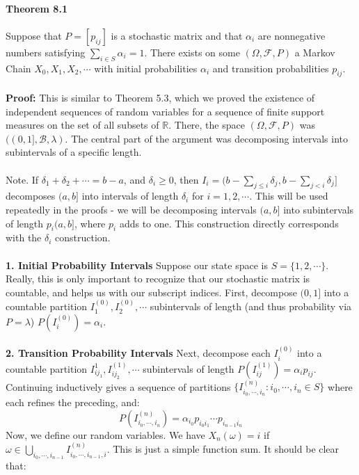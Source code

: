 \documentclass[12pt,a4paper]{article}
\newcommand{\1}[1]{\mathbbm{1}\left\{ #1 \right\}}
\newcommand{\R}{\mathbb{R}}
\newcommand{\fcal}{\mathcal{F}}
\newcommand{\bcal}{\mathcal{B}}
\begin{document}
\paragraph{Theorem 8.1} Suppose that $P = [p_{ij}]$ is a stochastic matrix and that $\alpha_i$ are nonnegative numbers satisfying $\sum_{i \in S} \alpha_i = 1$. There exists on some $(\Omega, \fcal, P)$ a Markov Chain $X_0, X_1, X_2, \cdots$ with initial probabilities $\alpha_i$ and transition probabilities $p_{ij}$.
\\\\
\textbf{Proof:} This is similar to Theorem 5.3, which we proved the existence of independent sequences of random variables for a sequence of finite support measures on the set of all subsets of $\R$. There, the space $(\Omega, \fcal, P)$ was $((0,1], \bcal, \lambda)$. The central part of the argument was decomposing intervals into subintervals of a specific length.
\\\\
Note. If $\delta_1 + \delta_2 + \cdots = b - a$, and $\delta_i \geq 0$, then $I_i = (b - \sum_{j \leq i} \delta_j, b - \sum_{j < i} \delta_j]$ decomposes $(a,b]$ into intervals of length $\delta_i$ for $i = 1, 2, \cdots$. This will be used repeatedly in the proofs - we will be decomposing intervals $(a,b]$ into subintervals of length $p_i(a,b]$, where $p_i$ adds to one. This construction directly corresponds with the $\delta_i$ construction.
\\\\
\textbf{1. Initial Probability Intervals} Suppose our state space is $S = \{1, 2, \cdots\}$. Really, this is only important to recognize that our stochastic matrix is countable, and helps us with our subscript indices. First, decompose $(0,1]$ into a countable partition $I_1^{(0)}, I_2^{(0)}, \cdots$ subintervals of length (and thus probability via $P = \lambda$) $P(I_i^{(0)}) = \alpha_i$. 
\\\\
\textbf{2. Transition Probability Intervals} Next, decompose each $I_i^{(0)}$ into a countable partition $I_{ij_1}^{1}, I_{ij_2}^{(1)}, \cdots$ subintervals of length $P(I_{ij}^{(1)}) = \alpha_ip_{ij}$. Continuing inductively gives a sequence of partitions $\{I_{i_0,\cdots,i_n}^{(n)} : i_0, \cdots, i_n \in S\}$ where each refines the preceding, and:
$$
	P\left(I_{i_0,\cdots,i_n}^{(n)}\right) = \alpha_{i_0}p_{i_0i_1} \cdots p_{i_{n-1}i_n}
$$
Now, we define our random variables. We have $X_n(\omega) = i$ if $\omega \in \bigcup_{i_0, \cdots, i_{n-1}} I_{i_0, \cdots, i_{n-1}, i}^{(n)}$. This is just a simple function sum. It should be clear that:
\end{document}
